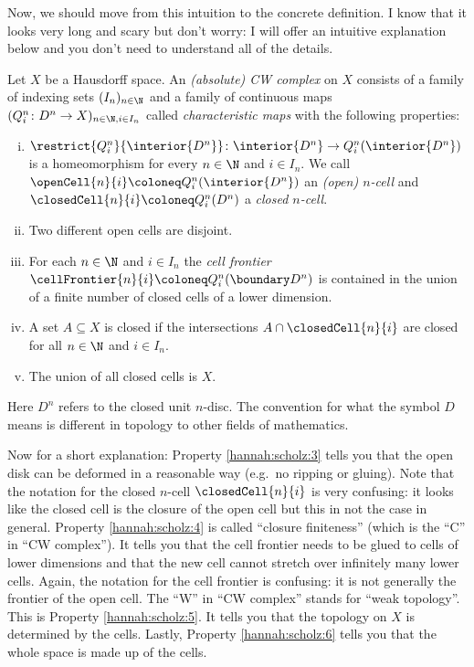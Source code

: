 Now, we should move from this intuition to the concrete definition. I know that it looks very long and scary but don't worry: I will offer an intuitive explanation below and you don't need to understand all of the details. 

\begin{definition}\label{hannah:scholz:7}
Let $X$ be a Hausdorff space. 
An \emph{(absolute) CW complex} on $X$ consists of a family of indexing sets $(I_n)_{n \in \N}$ and a family of continuous maps $(Q_i^n \colon D^n \to X)_{n \in \N, i \in I_n}$ called \emph{characteristic maps} with the following properties: 
\begin{enumerate}[(i)]
    \item $\restrict{Q_i^n}{\interior{D^n}} \colon \interior{D^n} \to Q_i^n(\interior{D^n})$ is a homeomorphism for every $n \in \N$ and $i \in I_n$. We call $\openCell{n}{i} \coloneq Q_i^n(\interior{D^n})$ an \emph{(open) $n$-cell} and $\closedCell{n}{i} \coloneq Q_i^n(D^n)$ a \emph{closed $n$-cell}. \label{hannah:scholz:3}
    \item Two different open cells are disjoint. \label{hannah:scholz:8}
    \item For each $n \in \N$ and $i \in I_n$ the \emph{cell frontier} $\cellFrontier{n}{i} \coloneq Q_i^n(\boundary D^n)$ is contained in the union of a finite number of closed cells of a lower dimension. \label{hannah:scholz:4}
    \item A set $A \subseteq X$ is closed if the intersections $A \cap \closedCell{n}{i}$ are closed for all $n \in \N$ and $i \in I_n$. \label{hannah:scholz:5}
    \item The union of all closed cells is $X$. \label{hannah:scholz:6}
\end{enumerate}
\end{definition}

Here $D^n$ refers to the closed unit $n$-disc. The convention for what the symbol $D$ means is different in topology to other fields of mathematics. 

Now for a short explanation: Property \ref{hannah:scholz:3} tells you that the open disk can be deformed in a reasonable way (e.g.\ no ripping or gluing). Note that the notation for the closed $n$-cell $\closedCell{n}{i}$ is very confusing: it looks like the closed cell is the closure of the open cell but this in not the case in general. Property \ref{hannah:scholz:4} is called ``closure finiteness'' (which is the ``C'' in ``CW complex''). It tells you that the cell frontier needs to be glued to cells of lower dimensions and that the new cell cannot stretch over infinitely many lower cells. Again, the notation for the cell frontier is confusing: it is not generally the frontier of the open cell. The ``W'' in ``CW complex'' stands for ``weak topology''. This is Property \ref{hannah:scholz:5}. It tells you that the topology on $X$ is determined by the cells. Lastly, Property \ref{hannah:scholz:6} tells you that the whole space is made up of the cells. 

